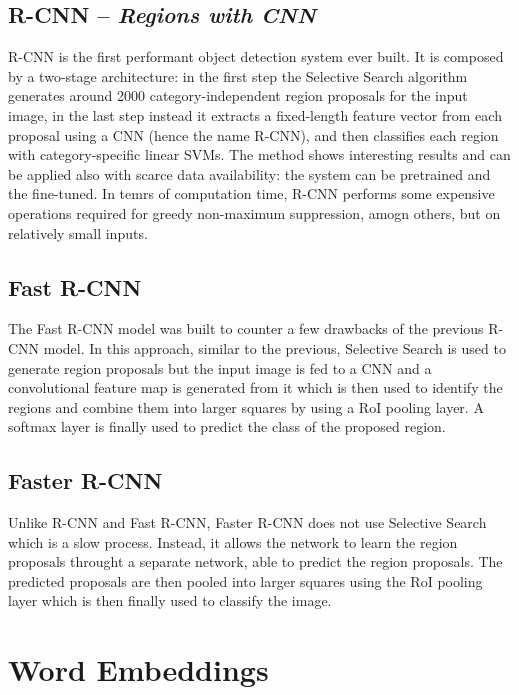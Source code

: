 \subsection{R-CNN -- \emph{Regions with CNN}}

R-CNN is the first performant object detection system ever built. It
is composed by a two-stage architecture: in the first step the
Selective Search algorithm generates around 2000 category-independent
region proposals for the input image, in the last step instead it
extracts a fixed-length feature vector from each proposal using a CNN
(hence the name R-CNN), and then classifies each region with
category-specific linear SVMs. The method shows interesting results
and can be applied also with scarce data availability: the system can
be pretrained and the fine-tuned. In temrs of computation time, R-CNN
performs some expensive operations required for greedy non-maximum
suppression, amogn others, but on relatively small inputs.

\subsection{Fast R-CNN}

The Fast R-CNN model was built to counter a few drawbacks of the
previous R-CNN model. In this approach, similar to the previous,
Selective Search is used to generate region proposals but the input
image is fed to a CNN and a convolutional feature map is generated
from it which is then used to identify the regions and combine them
into larger squares by using a RoI pooling layer. A softmax layer is
finally used to predict the class of the proposed region.

\subsection{Faster R-CNN}
\label{subsec:faster-rcnn}

Unlike R-CNN and Fast R-CNN, Faster R-CNN does not use Selective
Search which is a slow process. Instead, it allows the network to
learn the region proposals throught a separate network, able to
predict the region proposals. The predicted proposals are then pooled
into larger squares using the RoI pooling layer which is then finally
used to classify the image.


\section{Word Embeddings}
\label{sec:word-embeddings}


